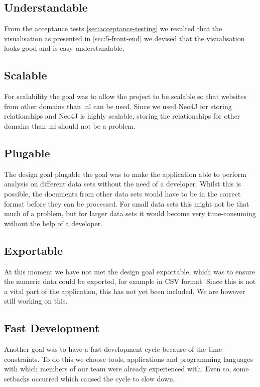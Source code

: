 \subsection{Understandable}
From the acceptance tests \ref{sec:acceptance-testing} we resulted that the visualisation as presented in \ref{sec:5-front-end} we devised that the visualisation looks good and is easy understandable.

\subsection{Scalable}
For scalability the goal was to allow the project to be scalable so that websites from other domains than .nl can be used. Since we used Neo4J for storing relationships and Neo4J is highly scalable, storing the relationships for other domains than .nl should not be a problem. 

\subsection{Plugable}
The design goal plugable the goal was to make the application able to perform analysis on different data sets without the need of a developer. Whilst this is possible, the documents from other data sets would have to be in the correct format before they can be processed. For small data sets this might not be that much of a problem, but for larger data sets it would become very time-consuming without the help of a developer.

\subsection{Exportable}
At this moment we have not met the design goal exportable, which was to ensure the numeric data could be exported, for example in CSV format. Since this is not a vital part of the application, this has not yet been included. We are however still working on this. 

\subsection{Fast Development}
Another goal was to have a fast development cycle because of the time constraints. To do this we choose tools, applications and programming languages with which members of our team were already experienced with. Even so, some setbacks occurred which caused the cycle to slow down.

